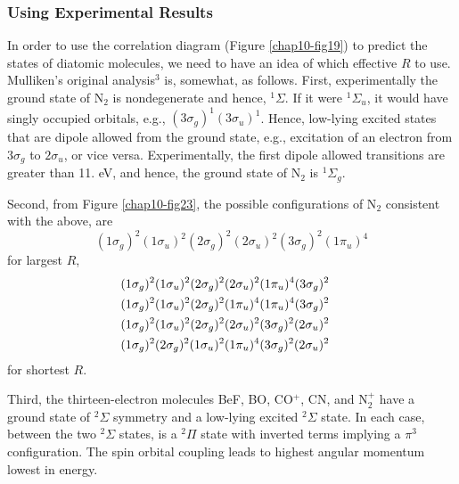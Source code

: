 \subsubsection{Using Experimental Results}

In order to use the correlation diagram (Figure \ref{chap10-fig19}) to
predict the states of diatomic molecules, we need to have an idea of
which effective $R$ to use.  Mulliken's original analysis$^3$ is,
somewhat, as follows.  First, experimentally the ground state of N$_2$
is nondegenerate and hence, ${^1\Sigma}$.  If it were ${^1\Sigma}_u$,
it would have singly occupied orbitals, e.g., $(3 \sigma_g)^1(3
\sigma_u)^1$.  Hence, low-lying excited states that are dipole allowed
from the ground state, e.g., excitation of an electron from $3
\sigma_g$ to $2 \sigma_u$, or vice versa.  Experimentally, the first
dipole allowed transitions are greater than 11. eV, and hence, the
ground state of N$_2$ is ${^1\Sigma}_g$.

Second, from Figure \ref{chap10-fig23}, the possible configurations of
N$_2$ consistent with the above, are
\begin{equation}
(1 \sigma_g )^2 ( 1 \sigma_u )^2 ( 2 \sigma_g )^2 ( 2 \sigma_u )^2 
(3 \sigma_g )^2 ( 1 \pi_u )^4
\end{equation}
for largest $R$,
\begin{eqnarray}
( 1 \sigma_g )^2 & ( 1 \sigma_u )^2 ( 2 \sigma_g )^2 ( 2 \sigma_u )^2 
( 1 \pi_u )^4 (3 \sigma_g )^2\cr
( 1 \sigma_g )^2 & ( 1 \sigma_u )^2 ( 2 \sigma_g )^2 ( 1 \pi_u )^4 
( 1 \pi_u )^4 (3 \sigma_g )^2\cr
( 1 \sigma_g )^2 & ( 1 \sigma_u )^2 ( 2 \sigma_g )^2 ( 2 \sigma_u )^2 
( 3 \sigma_g )^2 ( 2 \sigma_u )^2\cr
( 1 \sigma_g )^2 & ( 2 \sigma_g )^2 ( 1 \sigma_u )^2 ( 1 \pi_u )^4 
( 3 \sigma_g )^2 ( 2 \sigma_u )^2
\end{eqnarray}
for shortest $R$.

Third, the thirteen-electron molecules BeF, BO, CO$^+$, CN, and 
N$^+_2$ have a ground state of ${^2\Sigma}$ symmetry and a low-lying 
excited ${^2\Sigma}$ state.
In each case, between the two ${^2\Sigma}$ states, is a ${^2\Pi}$ 
state with inverted terms implying a $\pi^3$ configuration.  The spin 
orbital coupling leads to highest angular momentum lowest in energy.

